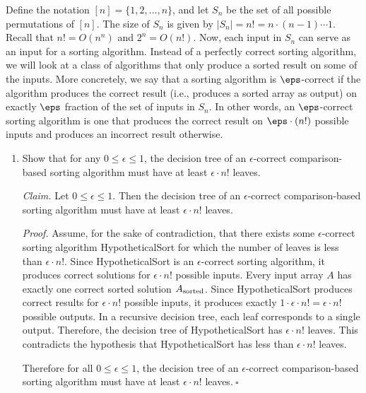 Define the notation $[n] = \{1, 2, \ldots, n\}$, and let $S_n$ be the set of all possible permutations of $[n]$. The size of $S_n$ is given by $|S_n|=n!=n\cdot (n-1) \cdots 1$. Recall that $n!=O(n^n)$ and $2^n=O(n!)$. 
Now, each input in $S_n$ can serve as an input for a sorting algorithm. Instead of a perfectly correct sorting algorithm, we will look at a class of algorithms that only produce a sorted result on some of the inputs. More concretely, we say that a sorting algorithm is $\eps$-correct if the algorithm produces the correct result (i.e., produces a sorted array as output) on exactly $\eps$ fraction of the set of inputs in $S_n$. In other words, an $\eps$-correct sorting algorithm is one that produces the correct result on $\eps \cdot (n!)$ possible inputs and produces an incorrect result otherwise.
\begin{enumerate}
    \item Show that for any $0\leq \epsilon\leq 1$, the decision tree of an $\epsilon$-correct comparison-based sorting algorithm must have at least $\epsilon \cdot n!$ leaves.
\begin{solution}
\textit{Claim. }Let $0\leq\epsilon\leq 1$. Then the decision tree of an $\epsilon$-correct comparison-based sorting algorithm must have at least $\epsilon\cdot n!$ leaves.

\textit{Proof. }Assume, for the sake of contradiction, that there exists some $\epsilon$-correct sorting algorithm {\sc HypotheticalSort} for which the number of leaves is less than $\epsilon\cdot n!$. Since {\sc HypotheticalSort} is an $\epsilon$-correct sorting algorithm, it produces correct solutions for $\epsilon\cdot n!$ possible inputs. Every input array $A$ has exactly one correct sorted solution $A_{\rm sorted}$. Since {\sc HypotheticalSort} produces correct results for $\epsilon\cdot n!$ possible inputs, it produces exactly $1\cdot\epsilon\cdot n!=\epsilon\cdot n!$ possible outputs. In a recursive decision tree, each leaf corresponds to a single output. Therefore, the decision tree of {\sc HypotheticalSort} has $\epsilon\cdot n!$ leaves. This contradicts the hypothesis that {\sc HypotheticalSort} has less than $\epsilon\cdot n!$ leaves.

Therefore for all $0\leq\epsilon\leq 1$, the decision tree of an $\epsilon$-correct comparison-based sorting algorithm must have at least $\epsilon\cdot n!$ leaves.$~\square$
\end{solution}
\end{enumerate}
\newpage

